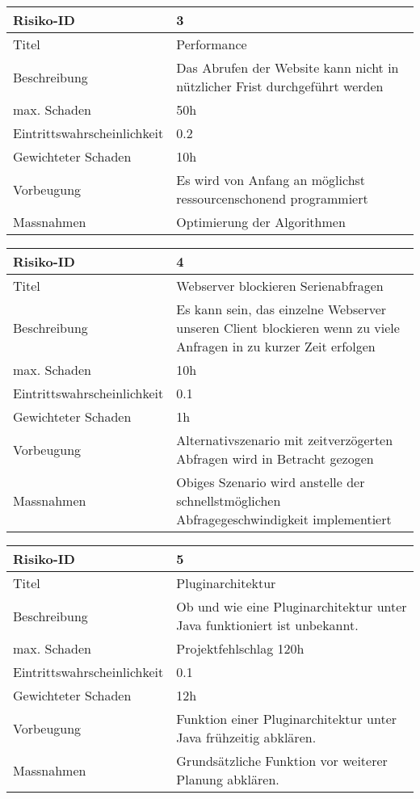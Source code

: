 \begin{table}[h!]
	\centering
	\begin{tabular}{|p{} | p{} |}
	\hline
	Risiko-ID & 3 \\
	\hline
	Titel & Performance \\
	Beschreibung & Das Abrufen der Website kann nicht in nützlicher Frist durchgeführt werden\\
	max. Schaden	& 50h \\
	Eintrittswahrscheinlichkeit & 0.2 \\
	Gewichteter Schaden	& 10h\\
	Vorbeugung	& Es wird von Anfang an möglichst ressourcenschonend programmiert \\
	Massnahmen	& Optimierung der Algorithmen\\
	\hline	
	\end{tabular}
\end{table}

\begin{table}[h!]
	\centering
	\begin{tabular}{|p{} | p{} |}
	\hline
	Risiko-ID & 4 \\
	\hline
	Titel & Webserver blockieren Serienabfragen \\
	Beschreibung & Es kann sein, das einzelne Webserver unseren Client blockieren wenn zu viele Anfragen in zu kurzer Zeit erfolgen \\
	max. Schaden	& 10h \\
	Eintrittswahrscheinlichkeit & 0.1 \\
	Gewichteter Schaden	& 1h \\
	Vorbeugung	& Alternativszenario mit zeitverzögerten Abfragen wird in Betracht gezogen \\
	Massnahmen	& Obiges Szenario wird anstelle der schnellstmöglichen Abfragegeschwindigkeit implementiert \\
	\hline	
	\end{tabular}
\end{table}

\begin{table}[h!]
	\centering
	\begin{tabular}{|p{} | p{} |}
	\hline
	Risiko-ID & 5 \\
	\hline
	Titel & Pluginarchitektur \\
	Beschreibung & Ob und wie eine Pluginarchitektur unter Java funktioniert ist unbekannt. \\
	max. Schaden	& Projektfehlschlag 120h \\
	Eintrittswahrscheinlichkeit & 0.1 \\
	Gewichteter Schaden	& 12h \\
	Vorbeugung	& Funktion einer Pluginarchitektur unter Java frühzeitig abklären. \\
	Massnahmen	& Grundsätzliche Funktion vor weiterer Planung abklären. \\
	\hline	
	\end{tabular}
\end{table}


